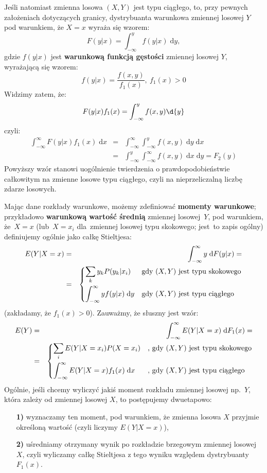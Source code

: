 \documentclass[10pt,a4paper]{article}
\newcommand{\dd}{\; \mathrm{d}}
\numberwithin{equation}{subsection}
\begin{document}
Jeśli natomiast zmienna losowa $(X,Y)$ jest typu ciągłego, to, przy pewnych
założeniach dotyczących granicy, dystrybuanta warunkowa zmiennej losowej $Y$
pod warunkiem, że $X=x$ wyraża się wzorem:
\begin{equation}
  F(y|x)=\int_{-\infty}^yf(y|x)\dd{y},
\end{equation}
gdzie $f(y|x)$ jest \textbf{warunkową funkcją gęstości} zmiennej losowej $Y$,
wyrażającą się wzorem:
\begin{equation}
  f(y|x) = \frac{f(x,y)}{f_1(x)},~f_1(x) > 0
\end{equation}
Widzimy zatem, że:
\[
  F(y|x)f_1(x) = \int_{-\infty}^y f(x,y)\d{y}
\]
czyli:
\begin{eqnarray}
  \nonumber
  \int_{-\infty}^{\infty} F(y|x) f_1(x) \dd{x} & = & \int_{-\infty}^{\infty} \int_{-\infty}^y f(x,y) \dd{y}\dd{x} \\
  \nonumber
  & = & \int_{-\infty}^y \int_{-\infty}^{\infty} f(x,y) \dd{x}\dd{y} = F_2(y)
\end{eqnarray}
Powyższy wzór stanowi uogólnienie twierdzenia o prawdopodobieństwie całkowitym
na zmienne losowe typu ciągłego, czyli na nieprzeliczalną liczbę zdarze
losowych.

Mając dane rozkłady warunkowe, możemy zdefiniować \textbf{momenty warunkowe};
przykładowo \textbf{warunkową wartość średnią} zmiennej losowej~$Y$,
pod warunkiem, że~$X=x$ (lub~$X=x_i$ dla~zmiennej losowej typu skokowego;
jest~to zapis ogólny) definiujemy ogólnie jako całkę Stieltjesa:
\begin{eqnarray}
  E(Y|X = x) &=& \int_{-\infty}^{\infty} y \dd{F(y|x)} = \\
  \nonumber
  &=& \begin{dcases}
    \sum_ky_kP(y_k|x_i) & \textrm{gdy $(X,Y)$ jest typu skokowego} \\
    \int_{-\infty}^{\infty}yf(y|x)\dd{y} & \textrm{gdy $(X,Y)$ jest typu ciągłego}
  \end{dcases}
\end{eqnarray}
(zakładamy, że $f_1(x)>0$). Zauważmy, że słuszny jest wzór:
\begin{eqnarray}
  E(Y) & = & \int_{-\infty}^{\infty}E(Y|X=x)\dd{F_1(x)} = \\
  \nonumber
  & = & \begin{dcases}
    \sum_iE(Y|X=x_i)P(X=x_i) & \textrm{, gdy $(X,Y)$ jest typu skokowego} \\
    \int_{-\infty}^{\infty}E(Y|X=x)f_1(x)\dd{x} & \textrm{, gdy $(X,Y)$ jest typu ciągłego}
  \end{dcases}
\end{eqnarray}
Ogólnie, jeśli chcemy wyliczyć jakiś moment rozkładu zmiennej losowej np.~$Y$,
która zależy od zmiennej losowej $X$, to postępujemy dwuetapowo:
\begin{enumerate}
  \item[\textbf{1)}] wyznaczamy ten moment, pod warunkiem, że zmienna losowa $X$
    przyjmie określoną wartość (czyli liczymy $E(Y|X = x)$),
  \item[\textbf{2)}] uśredniamy otrzymany wynik po rozkładzie brzegowym zmiennej
    losowej $X$, czyli wyliczamy całkę Stieltjesa z tego wyniku względem
    dystrybuanty $F_1(x)$.
\end{enumerate}
\end{document}
